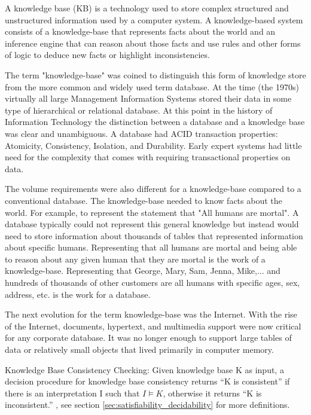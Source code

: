 A knowledge base (KB) \cite{knowledge_base} is a technology used to store complex structured and unstructured information used by a computer system. A knowledge-based system consists of a knowledge-base that represents facts about the world and an inference engine \cite{jena} that can reason about those facts and use rules and other forms of logic to deduce new facts or highlight inconsistencies.

The term "knowledge-base" was coined to distinguish this form of knowledge store from the more common and widely used term database. At the time (the 1970s) virtually all large Management Information Systems stored their data in some type of hierarchical or relational database. At this point in the history of Information Technology the distinction between a database and a knowledge base was clear and unambiguous. A database had ACID transaction properties: Atomicity, Consistency, Isolation, and Durability. Early expert systems had little need for the complexity that comes with requiring transactional properties on data. 

The volume requirements were also different for a knowledge-base compared to a conventional database. The knowledge-base needed to know facts about the world. For example, to represent the statement that "All humans are mortal". A database typically could not represent this general knowledge but instead would need to store information about thousands of tables that represented information about specific humans. Representing that all humans are mortal and being able to reason about any given human that they are mortal is the work of a knowledge-base. Representing that George, Mary, Sam, Jenna, Mike,... and hundreds of thousands of other customers are all humans with specific ages, sex, address, etc. is the work for a database.

The next evolution for the term knowledge-base was the Internet. With the rise of the Internet, documents, hypertext, and multimedia support were now critical for any corporate database. It was no longer enough to support large tables of data or relatively small objects that lived primarily in computer memory. 

Knowledge Base Consistency Checking:
Given knowledge base K as input, a decision procedure for knowledge base consistency returns “K is consistent” if there is an interpretation I such that $I \models K$, otherwise it returns “K is inconsistent.” \cite{KnowledgeBaseConsistency}, see section \ref{sec:satisfiability_decidability} for more definitions. 


